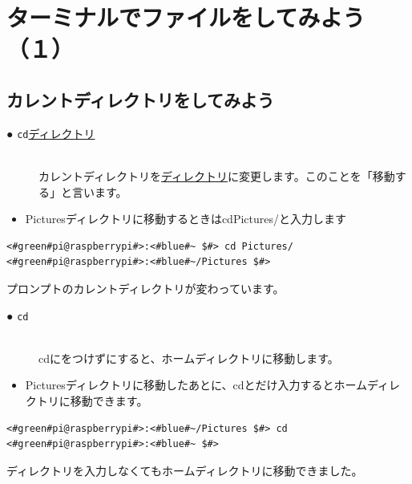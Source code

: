 \documentclass[text03.tex]{subfiles}
\begin{document}
\newpage
\section{ターミナルでファイルをしてみよう（１）}

\subsection{カレントディレクトリをしてみよう}
\begin{description}
\item[● \texttt{cd}\textvisiblespace \underline{ディレクトリ}]\mbox{}\\
カレントディレクトリを\underline{ディレクトリ}に変更します。このことを「移動する」と言います。
\end{description}
\begin{itemize}
\item[<例>] Picturesディレクトリに移動するときはcd\textvisiblespace Pictures/と入力します
\end{itemize}

\begin{lstlisting}[caption=cd directoryの例, label=cdDir]
<#green#pi@raspberrypi#>:<#blue#~ $#> cd Pictures/
<#green#pi@raspberrypi#>:<#blue#~/Pictures $#>
\end{lstlisting}
プロンプトのカレントディレクトリが変わっています。

\begin{description}
\item[● \texttt{cd}]\mbox{}\\
cdにをつけずにすると、ホームディレクトリに移動します。
\end{description}
\begin{itemize}
\item[<例>] Picturesディレクトリに移動したあとに、cdとだけ入力するとホームディレクトリに移動できます。
\end{itemize}
\begin{lstlisting}[caption=cdの例, label=cd]
<#green#pi@raspberrypi#>:<#blue#~/Pictures $#> cd
<#green#pi@raspberrypi#>:<#blue#~ $#> 
\end{lstlisting}
ディレクトリを入力しなくてもホームディレクトリに移動できました。\\
\end{document}
